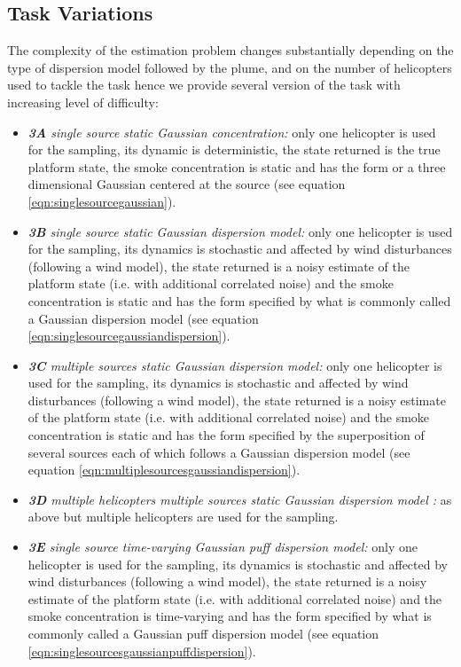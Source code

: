 \documentclass[a4paper,11pt]{report}
\begin{document}
\subsection{Task Variations}  \label{PlumeVariations}
The complexity of the estimation problem changes substantially depending on the type of dispersion model followed by the plume, and on the number of helicopters used to tackle the task hence we provide several version of the task with increasing level of difficulty:
\begin{itemize}
\item \textit{\textbf{3A} single source static Gaussian concentration:} only one helicopter is used for the sampling, its dynamic is deterministic, the state returned is the true platform state, the smoke concentration is static and has the form or a three dimensional Gaussian centered at the source (see equation \ref{eqn:singlesourcegaussian}).

\item \textit{\textbf{3B} single source static Gaussian dispersion model:} only one helicopter is used for the sampling, its dynamics is stochastic and affected by wind disturbances (following a wind model), the state returned is a noisy estimate of the platform state (i.e. with additional correlated noise) and the smoke concentration is static and has the form specified by what is commonly called a Gaussian dispersion model (see equation \ref{eqn:singlesourcegaussiandispersion}).

\item \textit{\textbf{3C} multiple sources static Gaussian dispersion model:} only one helicopter is used for the sampling, its dynamics is stochastic and affected by wind disturbances (following a wind model), the state returned is a noisy estimate of the platform state (i.e. with additional correlated noise) and the smoke concentration is static and has the form specified by the superposition of several sources each of which follows a Gaussian dispersion model (see equation \ref{eqn:multiplesourcesgaussiandispersion}).

\item \textit{\textbf{3D} multiple helicopters multiple sources static Gaussian dispersion model :} as above but multiple helicopters are used for the sampling.

\item \textit{\textbf{3E} single source time-varying Gaussian puff dispersion model:} only one helicopter is used for the sampling, its dynamics is stochastic and affected by wind disturbances (following a wind model), the state returned is a noisy estimate of the platform state (i.e. with additional correlated noise) and the smoke concentration is time-varying and has the form specified by what is commonly called a Gaussian puff dispersion model (see equation \ref{eqn:singlesourcesgaussianpuffdispersion}).


\end{itemize}
\end{document}
